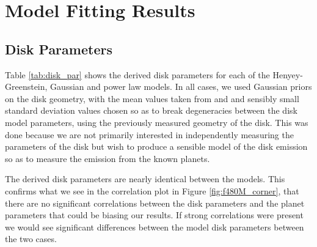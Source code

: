 \documentclass[11pt,twocolumn,twocolappendix]{aastex631}
\begin{document}
\appendix






\section{Model Fitting Results}
\label{sec:desc_of_geo}

\subsection{Disk Parameters}

{Table \ref{tab:disk_par} shows the derived disk parameters for each of the Henyey-Greenstein, Gaussian and power law models. %
In all %
cases}, we used Gaussian priors on the disk geometry, with the mean values taken from \cite{kep1} and \cite{kep2} and sensibly small standard deviation values chosen so as to break degeneracies between the disk model parameters, using the previously measured geometry of the disk. This was done because we are not primarily interested in independently measuring the parameters of the disk but wish to produce a sensible model of the disk emission so as to measure the emission from the known planets. 

The derived disk parameters are nearly identical between the models. %
This confirms what we see in the correlation plot in Figure \ref{fig:f480M_corner}, that there are no significant correlations between the disk parameters and the planet parameters {that could be biasing our results}. %
If {strong correlations were present} 
we would see significant differences between the model disk parameters between the two cases.
\end{document}
